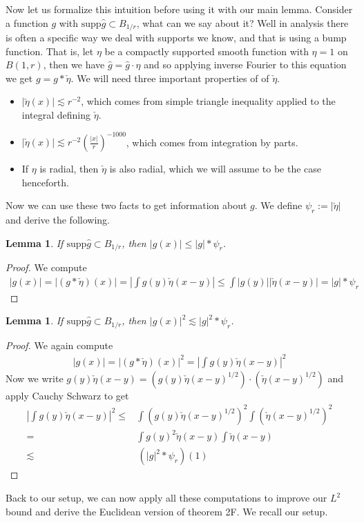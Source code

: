 \documentclass[12pt]{amsart}
\newtheorem{lemma}[theorem]{Lemma}
\newcommand{\spp}{\textrm{supp}}
\begin{document}
Now let us formalize this intuition before using it with our main lemma. Consider a function $g$ with $\spp \hat{g} \subset B_{1/r}$, what can we say about it? Well in analysis there is often a specific way we deal with supports we know, and that is using a bump function. That is, let $\eta$ be a compactly supported smooth function with $\eta = 1$ on $B(1,r)$, then we have $\hat{g} = \hat{g} \cdot \eta$ and so applying inverse Fourier to this equation we get
$
    g = g * \check{\eta}.
$
We will need three important properties of of $\check{\eta}$.
\begin{itemize}
    \item $|\check{\eta}(x)| \lesssim r^{-2}$, which comes from simple triangle inequality applied to the integral defining $\check{\eta}$.
    \item $|\check{\eta}(x)| \lesssim r^{-2} (\frac{|x|}{r})^{-1000}$, which comes from integration by parts.
    \item If $\eta$ is radial, then $\check{\eta}$ is also radial, which we will assume to be the case henceforth.
\end{itemize}
Now we can use these two facts to get information about $g$. We define $\psi_r := |\check{\eta}|$ and derive the following.
\begin{lemma}
    If $\spp \hat{g} \subset B_{1/r}$, then $|g(x)| \leq |g| * \psi_r$.
\end{lemma}
\begin{proof}
    We compute
    \begin{align*}
        |g(x)| = |(g * \check{\eta}) (x)| = \left|\int g(y) \check{\eta}(x - y)\right| \leq \int  |g(y)| |\check{\eta}(x - y)| = |g| * \psi_r
    \end{align*}
\end{proof}
\begin{lemma}
    If $\spp \hat{g} \subset B_{1/r}$, then $|g(x)|^2 \lesssim |g|^2 * \psi_r$.
\end{lemma}
\begin{proof}
    We again compute
    \begin{align*}
        |g(x)| = |(g * \check{\eta}) (x)|^2 = \left|\int g(y) \check{\eta}(x - y)\right|^2
    \end{align*}
    Now we write $g(y) \check{\eta}(x - y) = (g(y) \check{\eta}(x - y)^{1/2}) \cdot (\check{\eta}(x - y)^{1/2})$ and apply Cauchy Schwarz to get
    \begin{align*}
        \left|\int g(y) \check{\eta}(x - y)\right|^2
        \leq&
        \int (g(y) \check{\eta}(x - y)^{1/2})^2
        \int (\check{\eta}(x - y)^{1/2})^2
        \\ =&
        \int g(y)^2 \check{\eta}(x - y)
        \int \check{\eta}(x - y)
        \\ \lesssim& \,
        (|g|^2 * \psi_r) (1)
    \end{align*}
\end{proof}
Back to our setup, we can now apply all these computations to improve our $L^2$ bound and derive the Euclidean version of theorem 2F. We recall our setup.
\end{document}
